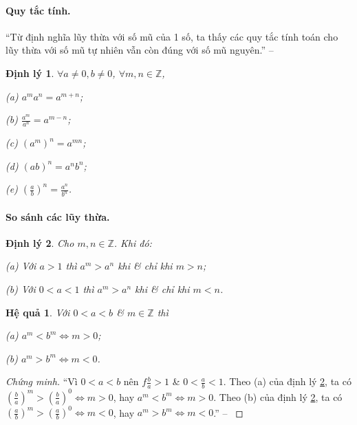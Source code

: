 \documentclass[oneside]{book}
\numberwithin{equation}{section}
\newtheorem{hequa}{Hệ quả}[section]
\newtheorem{dinhly}{Định lý}[section]
\begin{document}
\paragraph{Quy tắc tính.} ``Từ định nghĩa lũy thừa với số mũ của 1 số, ta thấy các quy tắc tính toán cho lũy thừa với số mũ tự nhiên vẫn còn đúng với số mũ nguyên.'' -- \cite[p. 70]{SGK_Toan_12_giai_tich_nang_cao}

\begin{dinhly}
	$\forall a\ne 0,b\ne 0$, $\forall m,n\in\mathbb{Z}$,
	\begin{enumerate*}
		\item[(a)] $a^ma^n = a^{m+n}$;
		\item[(b)] $\frac{a^m}{a^n} = a^{m-n}$;
		\item[(c)] $(a^m)^n = a^{mn}$;
		\item[(d)] $(ab)^n = a^nb^n$;
		\item[(e)] $\left(\frac{a}{b}\right)^n = \frac{a^n}{b^n}$.
	\end{enumerate*}
\end{dinhly}

\paragraph{So sánh các lũy thừa.}
\begin{dinhly}
	\label{thm:so sanh cac luy thua}
	Cho $m,n\in\mathbb{Z}$. Khi đó:
	\begin{enumerate*}
		\item[(a)] Với $a > 1$ thì $a^m > a^n$ khi \& chỉ khi $m > n$;
		\item[(b)] Với $0 < a < 1$ thì $a^m > a^n$ khi \& chỉ khi $m < n$.
	\end{enumerate*}
\end{dinhly}

\begin{hequa}
	Với $0 < a < b$ \& $m\in\mathbb{Z}$ thì
	\begin{enumerate*}
		\item[(a)] $a^m < b^m\Leftrightarrow m > 0$;
		\item[(b)] $a^m > b^m\Leftrightarrow m < 0$.
	\end{enumerate*}
\end{hequa}

\begin{proof}[Chứng minh]
	``Vì $0 < a < b$ nên $f\frac{b}{a} > 1$ \& $0 < \frac{a}{b} < 1$. Theo (a) của định lý \ref{thm:so sanh cac luy thua}, ta có $\left(\frac{b}{a}\right)^m > \left(\frac{b}{a}\right)^0\Leftrightarrow m > 0$, hay $a^m < b^m\Leftrightarrow m > 0$. Theo (b) của định lý \ref{thm:so sanh cac luy thua}, ta có $\left(\frac{a}{b}\right)^m > \left(\frac{a}{b}\right)^0\Leftrightarrow m < 0$, hay $a^m > b^m\Leftrightarrow m < 0$.'' -- \cite[p. 71]{SGK_Toan_12_giai_tich_nang_cao}
\end{proof}
\end{document}
